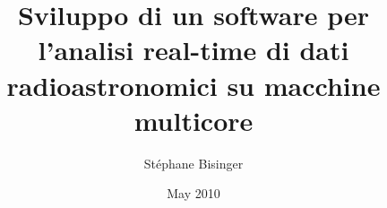 \documentclass[a4paper,11pt,twoside,openright]{unibo}
\begin{document}
\title{Sviluppo di un software per l'analisi real-time di dati
radioastronomici su macchine multicore}
\author{St\'ephane Bisinger}
\date{May 2010}

\maketitle
%

\tableofcontents
\listoffigures










\end{document}
